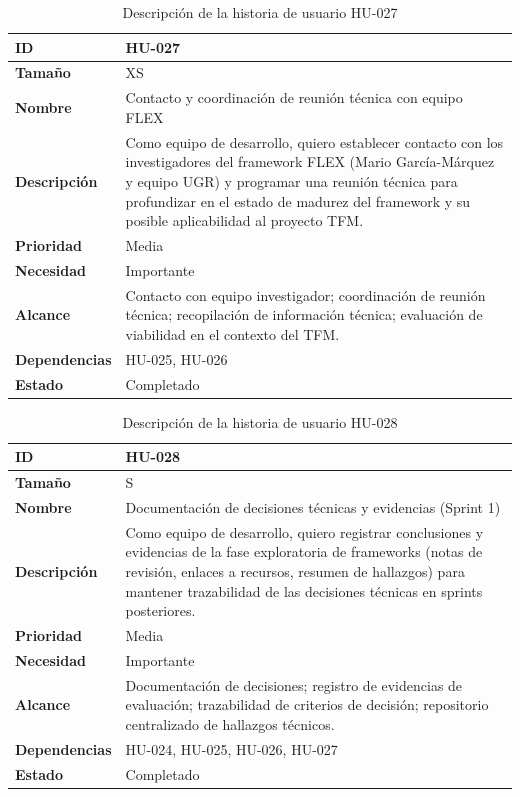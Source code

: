 \documentclass{report}
\begin{document}
\begin{table}[H]
\centering
\caption{Descripción de la historia de usuario HU-027}
\label{tab:hu027}
\begin{tabular}{|l|p{12cm}|}
\hline
\textbf{ID} & HU-027 \\ \hline
\textbf{Tamaño} & XS \\ \hline
\textbf{Nombre} & Contacto y coordinación de reunión técnica con equipo FLEX \\ \hline
\textbf{Descripción} &
Como equipo de desarrollo, quiero establecer contacto con los investigadores del framework FLEX (Mario García-Márquez y equipo UGR) y programar una reunión técnica para profundizar en el estado de madurez del framework y su posible aplicabilidad al proyecto TFM. \\ \hline
\textbf{Prioridad} & Media \\ \hline
\textbf{Necesidad} & Importante \\ \hline
\textbf{Alcance} &
Contacto con equipo investigador; coordinación de reunión técnica; recopilación de información técnica; evaluación de viabilidad en el contexto del TFM. \\ \hline
\textbf{Dependencias} & HU-025, HU-026 \\ \hline
\textbf{Estado} & Completado \\ \hline
\end{tabular}
\end{table}



\begin{table}[H]
\centering
\caption{Descripción de la historia de usuario HU-028}
\label{tab:hu028}
\begin{tabular}{|l|p{12cm}|}
\hline
\textbf{ID} & HU-028 \\ \hline
\textbf{Tamaño} & S \\ \hline
\textbf{Nombre} & Documentación de decisiones técnicas y evidencias (Sprint 1) \\ \hline
\textbf{Descripción} &
Como equipo de desarrollo, quiero registrar conclusiones y evidencias de la fase exploratoria de frameworks (notas de revisión, enlaces a recursos, resumen de hallazgos) para mantener trazabilidad de las decisiones técnicas en sprints posteriores. \\ \hline
\textbf{Prioridad} & Media \\ \hline
\textbf{Necesidad} & Importante \\ \hline
\textbf{Alcance} &
Documentación de decisiones; registro de evidencias de evaluación; trazabilidad de criterios de decisión; repositorio centralizado de hallazgos técnicos. \\ \hline
\textbf{Dependencias} & HU-024, HU-025, HU-026, HU-027 \\ \hline
\textbf{Estado} & Completado \\ \hline
\end{tabular}
\end{table}
\end{document}
